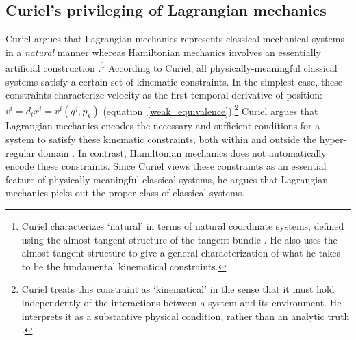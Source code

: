 \documentclass[letterpaper]{article}
\begin{document}
\subsection{Curiel's privileging of Lagrangian mechanics}
\label{Curiel}




Curiel argues that Lagrangian mechanics represents classical mechanical systems in a \textit{natural} manner whereas Hamiltonian mechanics involves an essentially artificial construction \parencites*[270]{Curiel}.\footnote{Curiel characterizes `natural' in terms of natural coordinate systems, defined using the almost-tangent structure of the tangent bundle \parencites*[290-291]{Curiel}. He also uses the almost-tangent structure to give a general characterization of what he takes to be the fundamental kinematical constraints.} According to Curiel, all physically-meaningful classical systems satisfy a certain set of kinematic constraints. In the simplest case, these constraints characterize velocity as the first temporal derivative of position: $v^i = d_t x^i = v^i(q^j, p_k)$ (equation~\ref{weak_equivalence}).\footnote{Curiel treats this constraint as `kinematical' in the sense that it must hold independently of the interactions between a system and its environment. He interprets it as a substantive physical condition, rather than an analytic truth \parencites*[282]{Curiel}.} Curiel argues that Lagrangian mechanics encodes the necessary and sufficient conditions for a system to satisfy these kinematic constraints, both within and outside the hyper-regular domain \parencites*[307--308, 311]{Curiel}. In contrast, Hamiltonian mechanics does not automatically encode these constraints. Since Curiel views these constraints as an essential feature of physically-meaningful classical systems, he argues that Lagrangian mechanics picks out the proper class of classical systems. 
\end{document}
